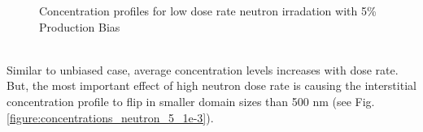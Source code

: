 \documentclass[a4paper]{article}
\begin{document}
\begin{figure}[h!]
        \caption{Concentration profiles for low dose rate neutron irradation with 5\% Production Bias}
        \label{figure:concentrations_neutron_5_1e-6}
      \end{figure}\\

      Similar to unbiased case, average concentration levels increases with dose rate. But, the most important effect of high neutron dose rate is causing the interstitial concentration profile to flip in smaller domain sizes than 500 nm (see Fig. \ref{figure:concentrations_neutron_5_1e-3}).\\
      \begin{figure}[htb!]  %
        \centering
        \qquad

\end{figure}
\end{document}
